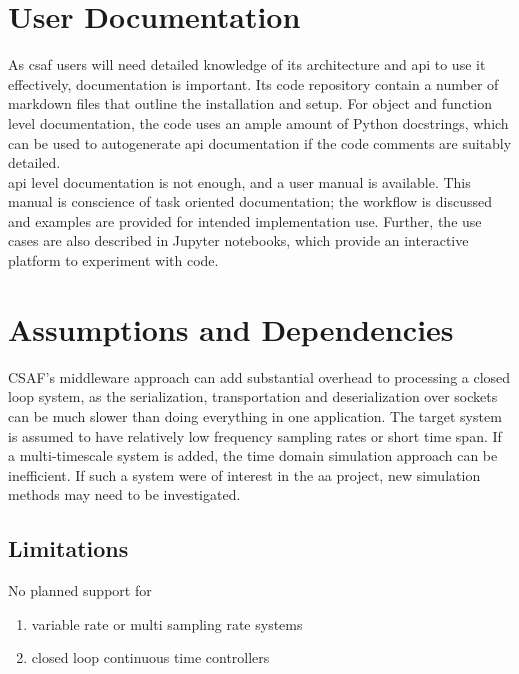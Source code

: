 \section{User Documentation}

As \acrshort{csaf} users will need detailed knowledge of its architecture and \acrshort{api} to use it effectively, documentation is important. Its code repository contain a number of markdown files that outline the installation and setup. For object and function level documentation, the code uses an ample amount of Python docstrings, which can be used to autogenerate \acrshort{api} documentation if the code comments are suitably detailed. \\

\acrshort{api} level documentation is not enough, and  a user manual is available. This manual is conscience of task oriented documentation; the workflow is discussed and examples are provided for intended implementation use. Further, the use cases are also described in Jupyter notebooks, which provide an interactive platform to experiment with code.

\section{Assumptions and Dependencies}

CSAF's middleware approach can add substantial overhead to processing a closed loop system, as the serialization, transportation and deserialization over sockets can be much slower than doing everything in one application. The target system is assumed to have relatively low frequency sampling rates or short time span. If a multi-timescale system is added, the time domain simulation approach can be inefficient. If such a system were of interest in the \acrshort{aa} project, new simulation methods may need to be investigated.\\

\subsection{Limitations}

No planned support for
\begin{enumerate}
\item   variable rate or multi sampling rate systems
\item  closed loop continuous time controllers
\end{enumerate}

